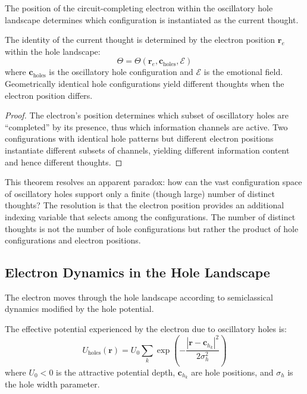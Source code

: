 The position of the circuit-completing electron within the oscillatory hole landscape determines which configuration is instantiated as the current thought.

\begin{theorem}
\label{thm:thought_identity}
The identity of the current thought is determined by the electron position $\mathbf{r}_e$ within the hole landscape:
\begin{equation}
\Theta = \Theta(\mathbf{r}_e, \mathbf{c}_{\text{holes}}, \mathcal{E})
\label{eq:thought_identity}
\end{equation}
where $\mathbf{c}_{\text{holes}}$ is the oscillatory hole configuration and $\mathcal{E}$ is the emotional field. Geometrically identical hole configurations yield different thoughts when the electron position differs.
\end{theorem}

\begin{proof}
The electron's position determines which subset of oscillatory holes are ``completed'' by its presence, thus which information channels are active. Two configurations with identical hole patterns but different electron positions instantiate different subsets of channels, yielding different information content and hence different thoughts.
\end{proof}

This theorem resolves an apparent paradox: how can the vast configuration space of oscillatory holes support only a finite (though large) number of distinct thoughts? The resolution is that the electron position provides an additional indexing variable that selects among the configurations. The number of distinct thoughts is not the number of hole configurations but rather the product of hole configurations and electron positions.

\subsection{Electron Dynamics in the Hole Landscape}

The electron moves through the hole landscape according to semiclassical dynamics modified by the hole potential.

\begin{definition}
\label{def:hole_potential}
The effective potential experienced by the electron due to oscillatory holes is:
\begin{equation}
U_{\text{holes}}(\mathbf{r}) = U_0 \sum_{k} \exp\left(-\frac{|\mathbf{r} - \mathbf{c}_{h_k}|^2}{2\sigma_h^2}\right)
\label{eq:hole_potential}
\end{equation}
where $U_0 < 0$ is the attractive potential depth, $\mathbf{c}_{h_k}$ are hole positions, and $\sigma_h$ is the hole width parameter.
\end{definition}


